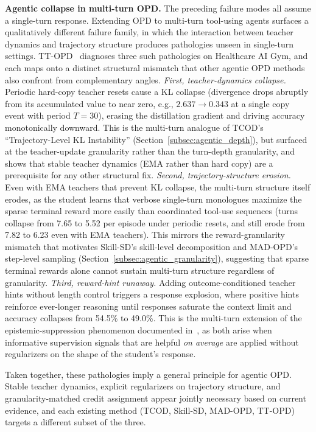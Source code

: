 \documentclass{article} %
\begin{document}
\textbf{Agentic collapse in multi-turn OPD.} The preceding failure modes all assume a single-turn response. Extending OPD to multi-turn tool-using agents surfaces a qualitatively different failure family, in which the interaction between teacher dynamics and trajectory structure produces pathologies unseen in single-turn settings. TT-OPD~\citep{2605.02943} diagnoses three such pathologies on Healthcare AI Gym, and each maps onto a distinct structural mismatch that other agentic OPD methods also confront from complementary angles. \emph{First, teacher-dynamics collapse.} Periodic hard-copy teacher resets cause a KL collapse (divergence drops abruptly from its accumulated value to near zero, e.g., $2.637 \to 0.343$ at a single copy event with period $T{=}30$), erasing the distillation gradient and driving accuracy monotonically downward. This is the multi-turn analogue of TCOD's ``Trajectory-Level KL Instability'' (Section~\ref{subsec:agentic_depth}), but surfaced at the teacher-update granularity rather than the turn-depth granularity, and shows that stable teacher dynamics (EMA rather than hard copy) are a prerequisite for any other structural fix. \emph{Second, trajectory-structure erosion.} Even with EMA teachers that prevent KL collapse, the multi-turn structure itself erodes, as the student learns that verbose single-turn monologues maximize the sparse terminal reward more easily than coordinated tool-use sequences (turns collapse from 7.65 to 5.52 per episode under periodic resets, and still erode from 7.82 to 6.23 even with EMA teachers). This mirrors the reward-granularity mismatch that motivates Skill-SD's skill-level decomposition and MAD-OPD's step-level sampling (Section~\ref{subsec:agentic_granularity}), suggesting that sparse terminal rewards alone cannot sustain multi-turn structure regardless of granularity. \emph{Third, reward-hint runaway.} Adding outcome-conditioned teacher hints without length control triggers a response explosion, where positive hints reinforce ever-longer reasoning until responses saturate the context limit and accuracy collapses from 54.5\% to 49.0\%. This is the multi-turn extension of the epistemic-suppression phenomenon documented in~\citet{2603.24472}, as both arise when informative supervision signals that are helpful \emph{on average} are applied without regularizers on the shape of the student's response.

Taken together, these pathologies imply a general principle for agentic OPD. Stable teacher dynamics, explicit regularizers on trajectory structure, and granularity-matched credit assignment appear jointly necessary based on current evidence, and each existing method (TCOD, Skill-SD, MAD-OPD, TT-OPD) targets a different subset of the three.
\end{document}

